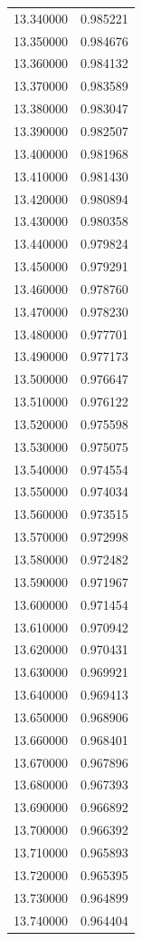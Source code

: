 \begin{tabular}{rr}
13.340000 & 0.985221 \\
13.350000 & 0.984676 \\
13.360000 & 0.984132 \\
13.370000 & 0.983589 \\
13.380000 & 0.983047 \\
13.390000 & 0.982507 \\
13.400000 & 0.981968 \\
13.410000 & 0.981430 \\
13.420000 & 0.980894 \\
13.430000 & 0.980358 \\
13.440000 & 0.979824 \\
13.450000 & 0.979291 \\
13.460000 & 0.978760 \\
13.470000 & 0.978230 \\
13.480000 & 0.977701 \\
13.490000 & 0.977173 \\
13.500000 & 0.976647 \\
13.510000 & 0.976122 \\
13.520000 & 0.975598 \\
13.530000 & 0.975075 \\
13.540000 & 0.974554 \\
13.550000 & 0.974034 \\
13.560000 & 0.973515 \\
13.570000 & 0.972998 \\
13.580000 & 0.972482 \\
13.590000 & 0.971967 \\
13.600000 & 0.971454 \\
13.610000 & 0.970942 \\
13.620000 & 0.970431 \\
13.630000 & 0.969921 \\
13.640000 & 0.969413 \\
13.650000 & 0.968906 \\
13.660000 & 0.968401 \\
13.670000 & 0.967896 \\
13.680000 & 0.967393 \\
13.690000 & 0.966892 \\
13.700000 & 0.966392 \\
13.710000 & 0.965893 \\
13.720000 & 0.965395 \\
13.730000 & 0.964899 \\
13.740000 & 0.964404 \\

\end{tabular}
